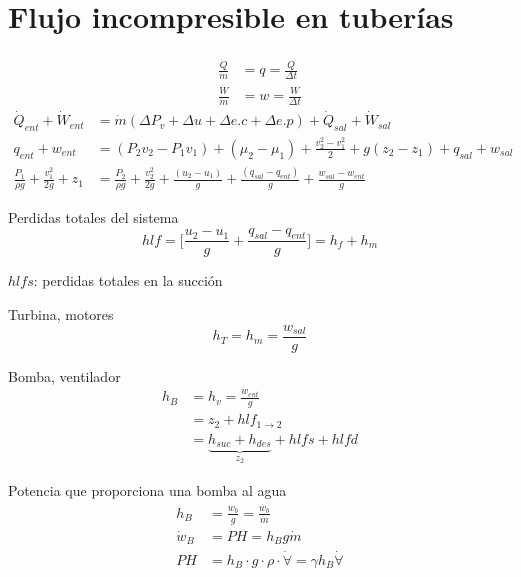 \section{Flujo incompresible en tuberías}
\[
    \begin{split}
        \frac{ \dot{Q} }{ \dot{m} } & = q = \frac{ Q }{ \Delta t } \\
        \frac{ \dot{W} }{ \dot{m} } & = w = \frac{ W }{ \Delta t }
    \end{split}
\]
\[
    \begin{split}
        \dot{Q}_{ent} + \dot{W}_{ent} & = \dot{m} ( \Delta P_{v} + \Delta u + \Delta e.c + \Delta e.p) + \dot{Q}_{sal} + \dot{W}_{sal} \\
        q_{ent} + w_{ent} & = (P_{2}v_{2} - P_{1}v_{1}) + (\mu_{2} - \mu_{1}) + \frac{ v_{2}^{2} - v_{1}^{2} }{ 2 } + g(z_{2} - z_{1}) + q_{sal} + w_{sal} \\
        \frac{ P_{1} }{ \rho g } + \frac{ v_{1}^{2} }{ 2g } + z_{1} & = \frac{ P_{2} }{ \rho g } + \frac{ v_{2}^{2} }{ 2g } + \frac{ (u_{2} - u_{1}) }{ g } + \frac{ (q_{sal} - q_{ent}) }{ g } + \frac{ w_{sal} - w_{ent} }{ g }
    \end{split}
\]

Perdidas totales del sistema
\[
    hlf = \Big[ \frac{ u_{2} - u_{1} }{ g } + \frac{ q_{sal} - q_{ent} }{ g }\Big] = h_{f} + h_{m}
\]

\( hlfs \): perdidas totales en la succión 

Turbina, motores
\[
    h_{T} = h_{m} = \frac{ w_{sal} }{ g }
\]

Bomba, ventilador
\[
    \begin{split}
        h_{B} & = h_{v} = \frac{ w_{ent} }{ g } \\
        & = z_{2} + hlf_{1 \to 2} \\
        & = \underbrace{ h_{suc} + h_{des} }_{ z_{2} } + hlfs + hlfd
    \end{split}
\]

Potencia que proporciona una bomba al agua
\[
    \begin{split}
        h_{B} & = \frac{ w_{b} }{ g } = \frac{ \dot{w_{b}} }{ \dot{m} } \\
        \dot{w}_{B} & = PH = h_{B} g \dot{m} \\
        PH & = h_{B} \cdot g \cdot \rho \cdot \dot{ \forall } = \gamma h_{B} \dot{ \forall }
    \end{split}
\]

